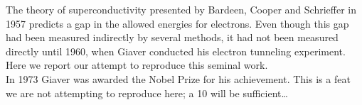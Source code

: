 
The theory of superconductivity presented by Bardeen, Cooper and Schrieffer in 1957 predicts a gap in the allowed energies for electrons. Even though this gap had been measured indirectly by several methods, it had not been measured directly until 1960, when Giaver conducted his electron tunneling experiment. Here we report our attempt to reproduce this seminal work.\\
In 1973 Giaver was awarded the Nobel Prize for his achievement. This is a feat we are not attempting to reproduce here; a 10 will be sufficient\dots
